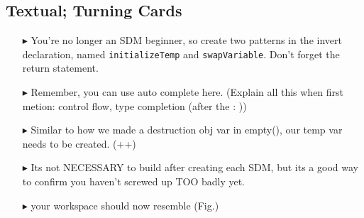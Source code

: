 \newpage
\subsection{Textual; Turning Cards}
\texHeader
\hypertarget{invertCard tex}{}

\begin{itemize}

\item[$\blacktriangleright$] You're no longer an SDM beginner, so create two patterns in the invert declaration, named \texttt{initializeTemp} and
\texttt{swapVariable}. Don't forget the return statement.

\item[$\blacktriangleright$] Remember, you can use auto complete here. (Explain all this when first metion: control flow, type completion (after the : ))

\item[$\blacktriangleright$] Similar to how we made a destruction obj var in empty(), our temp var needs to be created. (++)

\item[$\blacktriangleright$] Its not NECESSARY to build after creating each SDM, but its a good way to confirm you haven't screwed up TOO badly yet.

\item[$\blacktriangleright$] your workspace should now resemble (Fig.)

\end{itemize}